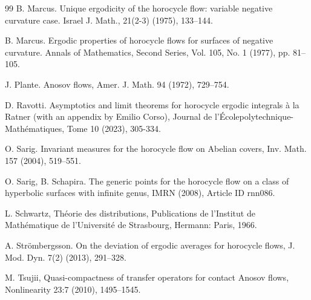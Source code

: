 \documentclass[11pt,letterpaper]{amsart}
\theoremstyle{definition}
\begin{document}
\begin{thebibliography}{99}
 B. Marcus. Unique ergodicity of the horocycle flow: variable negative curvature case. Israel J. Math., 21(2-3) (1975), 133--144.

 B. Marcus. Ergodic properties of horocycle flows for surfaces of negative curvature. Annals of Mathematics, Second Series, Vol. 105, No. 1 (1977), pp. 81--105.

 J. Plante. Anosov flows, Amer. J. Math. 94 (1972), 729--754.

 D. Ravotti. Asymptotics and limit theorems for horocycle ergodic integrals \`a la Ratner (with an appendix by Emilio Corso), Journal de l'\'Ecolepolytechnique-Math\'ematiques, Tome 10 (2023), 305-334. 

 O. Sarig. Invariant measures for the horocycle flow on Abelian covers, Inv. Math. 157 (2004),
519--551.

O. Sarig, B. Schapira. The generic points for the horocycle flow on a class of hyperbolic surfaces
with infinite genus, IMRN (2008), Article ID rnn086.

 L. Schwartz, Th\'eorie des distributions, Publications de l'Institut de Math\'ematique de l'Universit\'e de Strasbourg, Hermann: Paris, 1966.

 A. Str\"{o}mbergsson. On the deviation of ergodic averages for horocycle flows, J. Mod. Dyn.
7(2) (2013), 291--328.

 M. Tsujii, Quasi-compactness of transfer operators for contact Anosov flows, Nonlinearity 23:7 (2010), 1495--1545.

\end{thebibliography}
\end{document}
